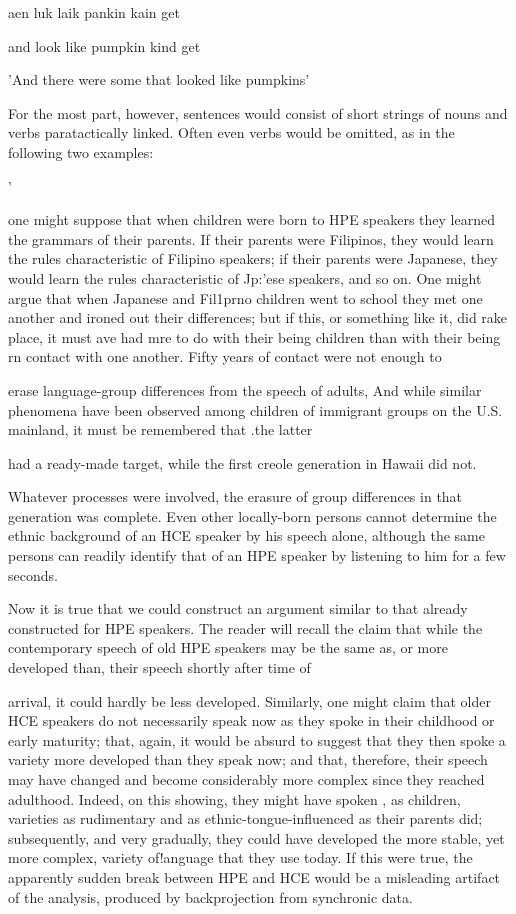 \ea\label{ex:14}
aen luk laik pankin kain get
\glt
\z

and look like pumpkin kind get

'And there were some that looked like pumpkins'

For the most part, however, sentences would consist of short strings of nouns and verbs paratactically linked. Often even verbs would be omitted, as in the following two examples:

'

one might suppose that when children were born to HPE speakers they learned the grammars of their parents. If their parents were Filipinos, they would learn the rules characteristic of Filipino speakers; if their parents were Japanese, they would learn the rules characteristic of Jp{\textquotedbl}:'ese speakers, and so on. One might argue that when Japanese and Fil1prno children went to school they met one another and ironed out their differences; but if this, or something like it, did rake place, it must ave had mre to do with their being children than with their being rn contact with one another. Fifty years of contact were not enough to

erase language-group differences from the speech of adults, And while similar phenomena have been observed among children of immigrant groups on the U.S. mainland, it must be remembered that .the latter

had a ready-made target, while the first creole generation in Hawaii did not.

Whatever processes were involved, the erasure of group differ\-ences in that generation was complete. Even other locally-born persons cannot determine the ethnic background of an HCE speaker by his speech alone, although the same persons can readily identify that of an HPE speaker by listening to him for a few seconds.

Now it is true that we could construct an argument similar to that already constructed for HPE speakers. The reader will recall the claim that while the contemporary speech of old HPE speakers may be the same as, or more developed than, their speech shortly after time of


arrival, it could hardly be less developed. Similarly, one might claim that older HCE speakers do not necessarily speak now as they spoke in their childhood or early maturity; that, again, it would be absurd to suggest that they then spoke a variety more developed than they speak now; and that, therefore, their speech may have changed and become considerably more complex since they reached adulthood. Indeed, on this showing, they might have spoken , as children, varieties as rudimentary and as ethnic-tongue-influenced as their parents did; subsequently, and very gradually, they could have developed the more stable, yet more complex, variety of!anguage that they use today. If this were true, the apparently sudden break between HPE and HCE would be a misleading artifact of the analysis, produced by back\-projection from synchronic data.


